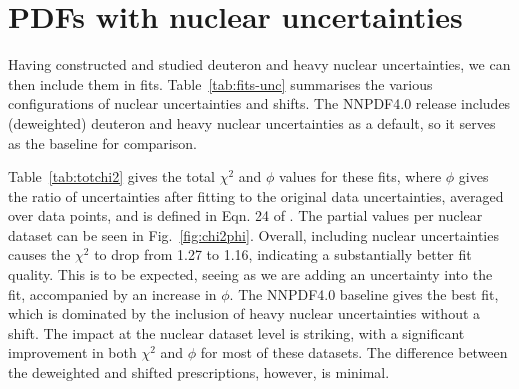 \section{PDFs with nuclear uncertainties}
\label{sec:nucpdfs}
Having constructed and studied deuteron and heavy nuclear uncertainties, we can then include them in fits. Table~\ref{tab:fits-unc} summarises the various configurations of nuclear uncertainties and shifts. The NNPDF4.0 release includes (deweighted) deuteron and heavy nuclear uncertainties as a default, so it serves as the baseline for comparison.


Table~\ref{tab:totchi2} gives the total $\chi^2$ and $\phi$ values for these fits, where $\phi$ gives the ratio of uncertainties after fitting to the original data uncertainties, averaged over data points, and is defined in Eqn. 24 of \cite{Ball:2014uwa}. The partial values per nuclear dataset can be seen in Fig.~\ref{fig:chi2phi}. Overall, including nuclear uncertainties causes the $\chi^2$ to drop from 1.27 to 1.16, indicating a substantially better fit quality. This is to be expected, seeing as we are adding an uncertainty into the fit, accompanied by an increase in $\phi$. The NNPDF4.0 baseline gives the best fit, which is dominated by the inclusion of heavy nuclear uncertainties without a shift. The impact at the nuclear dataset level is striking, with a significant improvement in both $\chi^2$ and $\phi$ for most of these datasets. The difference between the deweighted and shifted prescriptions, however, is minimal.
